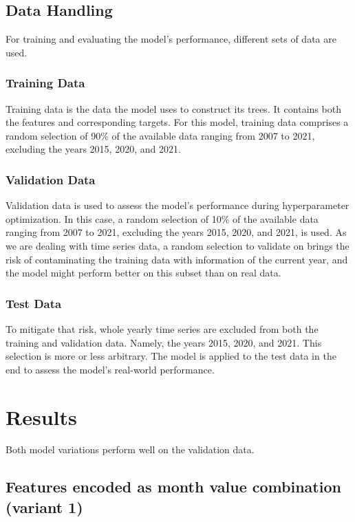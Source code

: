 \documentclass{article}
\begin{document}
\subsection{Data Handling}
For training and evaluating the model's performance, different sets of data are used.
\subsubsection{Training Data}
Training data is the data the model uses to construct its trees. It contains both the features and corresponding targets.
For this model, training data comprises a random selection of 90\% of the available data ranging from 2007 to 2021, excluding the years 2015, 2020, and 2021.
\subsubsection{Validation Data}
Validation data is used to assess the model's performance during hyperparameter optimization.
In this case, a random selection of 10\% of the available data ranging from 2007 to 2021, excluding the years 2015, 2020, and 2021, is used.
As we are dealing with time series data, a random selection to validate on brings the risk of contaminating the training data with information of the current year, and the model might perform better on this subset than on real data.
\subsubsection{Test Data}
To mitigate that risk, whole yearly time series are excluded from both the training and validation data. Namely, the years 2015, 2020, and 2021. This selection is more or less arbitrary.
The model is applied to the test data in the end to assess the model's real-world performance.
\section{Results}
Both model variations perform well on the validation data.
\subsection{Features encoded as month value combination (variant 1)}
\end{document}
